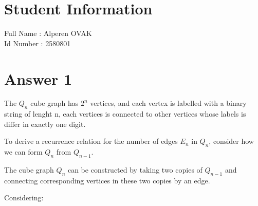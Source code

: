 \documentclass[12pt]{article}
\begin{document}
\section*{Student Information } 
Full Name :  Alperen OVAK\\
Id Number :  2580801\\

\section*{Answer 1}

The \( Q_n \) cube graph has \( 2^n \) vertices, and each vertex is labelled with a binary string of lenght n, each vertices is connected to other vertices whose labels is differ in exactly one digit.

To derive a recurrence relation for the number of edges \( E_n \) in \( Q_n \), consider how we can form \( Q_n \) from \( Q_{n-1} \).

The cube graph \( Q_n \) can be constructed by taking two copies of \( Q_{n-1} \) and connecting corresponding vertices in these two copies by an edge.

Considering:
\end{document}
